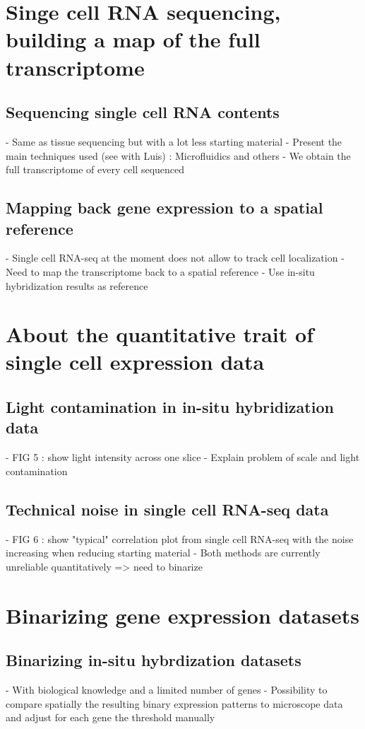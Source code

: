 \section{Singe cell RNA sequencing, building a map of the full transcriptome}
  \subsection*{Sequencing single cell RNA contents}
    - Same as tissue sequencing but with a lot less starting material
    - Present the main techniques used (see with Luis) : Microfluidics and others
    - We obtain the full transcriptome of every cell sequenced

  \subsection*{Mapping back gene expression to a spatial reference}
    - Single cell RNA-seq at the moment does not allow to track cell localization
    - Need to map the transcriptome back to a spatial reference
    - Use in-situ hybridization results as reference


\section{About the quantitative trait of single cell expression data}
  \subsection*{Light contamination in in-situ hybridization data}
    - FIG 5 : show light intensity across one slice
    - Explain problem of scale and light contamination

  \subsection*{Technical noise in single cell RNA-seq data}
    - FIG 6 : show "typical" correlation plot from single cell RNA-seq with the noise increasing when reducing starting material
    - Both methods are currently unreliable quantitatively => need to binarize

\section{Binarizing gene expression datasets}
  \subsection*{Binarizing in-situ hybrdization datasets}
    - With biological knowledge and a limited number of genes
    - Possibility to compare spatially the resulting binary expression patterns to microscope data and adjust for each gene the threshold manually
